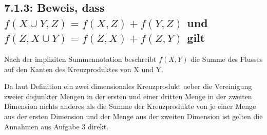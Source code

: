 \subsection*{7.1.3: Beweis, dass $f(X\cup Y,Z)=f(X,Z)+f(Y,Z)$ und $f(Z,X\cup Y)=f(Z,X)+f(Z,Y)$ gilt}

Nach der impliziten Summennotation beschreibt $f(X,Y)$ die Summe des Flusses auf den Kanten des Kreuzproduktes von X und Y.

Da laut Definition ein zwei dimensionales Kreuzprodukt ueber die Vereinigung zweier disjunkter Mengen in der ersten und einer dritten Menge in der zweiten Dimension nichts anderes als die Summe der Kreuzprodukte von je einer Menge aus der ersten Dimension und der Menge aus der zweiten Dimension ist gelten die Annahmen aus Aufgabe 3 direkt.

